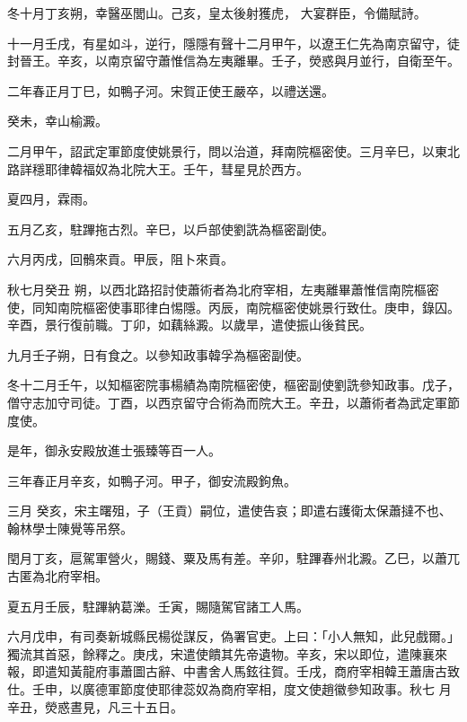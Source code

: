 \begin{pinyinscope}
 冬十月丁亥朔，幸醫巫閭山。己亥，皇太後射獲虎，
 大宴群臣，令備賦詩。



 十一月壬戌，有星如斗，逆行，隱隱有聲十二月甲午，以遼王仁先為南京留守，徒封晉王。辛亥，以南京留守蕭惟信為左夷離畢。壬子，熒惑與月並行，自衛至午。



 二年春正月丁巳，如鴨子河。宋賀正使王嚴卒，以禮送還。



 癸未，幸山榆澱。



 二月甲午，詔武定軍節度使姚景行，問以治道，拜南院樞密使。三月辛巳，以東北路詳穩耶律韓福奴為北院大王。壬午，彗星見於西方。



 夏四月，霖雨。



 五月乙亥，駐蹕拖古烈。辛巳，以戶部使劉詵為樞密副使。



 六月丙戌，回鶻來貢。甲辰，阻卜來貢。



 秋七月癸丑
 朔，以西北路招討使蕭術者為北府宰相，左夷離畢蕭惟信南院樞密使，同知南院樞密使事耶律白惕隱。丙辰，南院樞密使姚景行致仕。庚申，錄囚。辛酉，景行復前職。丁卯，如藕絲澱。以歲旱，遣使振山後貧民。



 九月壬子朔，日有食之。以參知政事韓孚為樞密副使。



 冬十二月壬午，以知樞密院事楊績為南院樞密使，樞密副使劉詵參知政事。戊子，僧守志加守司徒。丁酉，以西京留守合術為而院大王。辛丑，以蕭術者為武定軍節度使。



 是年，御永安殿放進士張臻等百一人。



 三年春正月辛亥，如鴨子河。甲子，御安流殿鉤魚。



 三月
 癸亥，宋主曙殂，子（王貢）嗣位，遣使告哀；即遣右護衛太保蕭撻不也、翰林學士陳覺等吊祭。



 閏月丁亥，扈駕軍營火，賜錢、粟及馬有差。辛卯，駐蹕春州北澱。乙巳，以蕭兀古匿為北府宰相。



 夏五月壬辰，駐蹕納葛濼。壬寅，賜隨駕官諸工人馬。



 六月戊申，有司奏新城縣民楊從謀反，偽署官吏。上曰：「小人無知，此兒戲爾。」獨流其首惡，餘釋之。庚戌，宋遣使饋其先帝遺物。辛亥，宋以即位，遣陳襄來報，即遣知黃龍府事蕭圖古辭、中書舍人馬鉉往賀。壬戌，商府宰相韓王蕭唐古致仕。壬申，以廣德軍節度使耶律蕊奴為商府宰相，度文使趙徽參知政事。秋七
 月辛丑，熒惑晝見，凡三十五日。




\end{pinyinscope}
